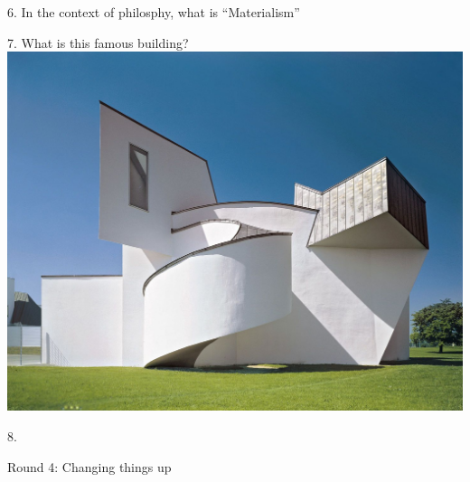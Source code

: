 \begin{frame}
\begin{center}
\Large
6. In the context of philosphy, what is ``Materialism''
\\
\end{center}
\end{frame}
\begin{frame}
\begin{center}
\Large
7. What is this famous building?
\\
\vspace{0.5em}\includegraphics[height=0.6\paperheight]{images/vitra.jpg}
\\
\end{center}
\end{frame}
\begin{frame}
\begin{center}
\Large
8. 
\end{center}
\end{frame}
\begin{frame}
\begin{center}
\Huge
Round 4: Changing things up
\end{center}
\end{frame}
